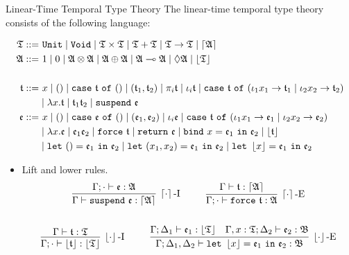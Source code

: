 \begin{frame}[allowframebreaks]{Linear-Time Temporal Type Theory}
    The linear-time temporal type theory \cite{Paykin2016TheEO} consists of the following language:

    \begin{align*}
        \mathfrak{T} ::=&~ \mathtt{Unit} \mid \mathtt{Void} \mid \mathfrak{T} \times \mathfrak{T} \mid \mathfrak{T} + \mathfrak{T} \mid \mathfrak{T} \rightarrow \mathfrak{T} \mid \left\lceil \mathfrak{A} \right\rceil \\
        \mathfrak{A} ::=&~ 1 \mid 0 \mid \mathfrak{A} \otimes \mathfrak{A} \mid \mathfrak{A} \oplus \mathfrak{A} \mid \mathfrak{A} \multimap \mathfrak{A} \mid \lozenge\mathfrak{A} \mid \left\lfloor \mathfrak{T} \right\rfloor \\
        \\
        \mathfrak{t} ::=&~ x \mid () \mid \mathtt{case}~\mathfrak{t}~\mathtt{of}~() \mid (\mathfrak{t}_1, \mathfrak{t}_2) \mid \pi_i \mathfrak{t} \mid \iota_i \mathfrak{t} \mid \mathtt{case}~\mathfrak{t}~\mathtt{of}~(\iota_1 x_1 \rightarrow \mathfrak{t}_1 \mid \iota_2 x_2 \rightarrow \mathfrak{t}_2) \\
        & \mid \lambda x. \mathfrak{t} \mid \mathfrak{t}_1 \mathfrak{t}_2 \mid \mathtt{suspend}~\mathfrak{e} \\
        \mathfrak{e} ::=&~ x \mid () \mid \mathtt{case}~\mathfrak{e}~\mathtt{of}~() \mid (\mathfrak{e}_1, \mathfrak{e}_2) \mid \iota_i \mathfrak{e} \mid \mathtt{case}~\mathfrak{t}~\mathtt{of}~(\iota_1 x_1 \rightarrow \mathfrak{e}_1 \mid \iota_2 x_2 \rightarrow \mathfrak{e}_2) \\
        & \mid \lambda x. \mathfrak{e} \mid \mathfrak{e}_1 \mathfrak{e}_2 \mid \mathtt{force}~\mathfrak{t} \mid \mathtt{return}~\mathfrak{e} \mid \mathtt{bind}~x = \mathfrak{e}_1~\mathtt{in}~\mathfrak{e}_2 \mid \left\lfloor \mathfrak{t} \right\rfloor \\
        &\mid \mathtt{let}~() = \mathfrak{e}_1~\mathtt{in}~\mathfrak{e}_2 \mid \mathtt{let}~(x_1, x_2) = \mathfrak{e}_1~\mathtt{in}~\mathfrak{e}_2 \mid \mathtt{let}~\left\lfloor x \right\rfloor = \mathfrak{e}_1~\mathtt{in}~\mathfrak{e}_2
    \end{align*}

    \begin{itemize}
        \item Lift and lower rules.
        \begin{gather*}
        \infer[\ceil{\cdot}\mbox{-I}]{\Gamma \vdash \mathtt{suspend}~\e : \ceil{\A}}{\Gamma; \cdot \vdash \e : \A}
        ~~~~ ~~~~
        \infer[\ceil{\cdot}\mbox{-E}]{\Gamma; \cdot \vdash \mathtt{force}~\t : \A}{\Gamma \vdash \t : \ceil{\A}}
        \\ \\ 
        \infer[\floor{\cdot}\mbox{-I}]{\Gamma; \cdot \vdash \floor{\t} : \floor{\T}}{\Gamma \vdash \t : \T}
        ~~~~ ~~~~
        \infer[\floor{\cdot}\mbox{-E}]{\Gamma; \Delta_1, \Delta_2 \vdash \mathtt{let}~\floor{x} = \e_1~\mathtt{in}~\e_2 : \mathfrak{B}}{
            \Gamma; \Delta_1 \vdash \e_1 : \floor{\T}
            &
            \Gamma, x : \T; \Delta_2 \vdash \e_2 : \mathfrak{B}
        }
        \end{gather*}
    \end{itemize}
\end{frame}

